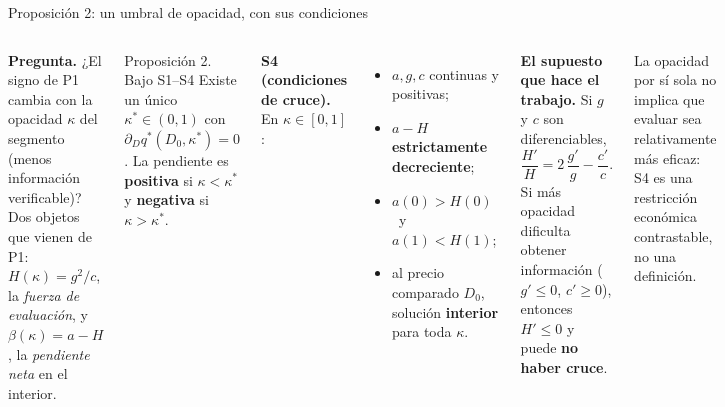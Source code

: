 \documentclass[aspectratio=169,10pt,t]{beamer}
\newcommand{\qs}{q^{*}}
\begin{document}
\begin{frame}{Proposición 2: un umbral de opacidad, con sus condiciones}
\vspace{1.3mm}
\begin{columns}[T,onlytextwidth]
{\small\textbf{Pregunta.} ¿El signo de P1 cambia con la opacidad $\kappa$ del
segmento (menos información verificable)? Dos objetos que vienen de P1:
$H(\kappa)=g^{2}/c$, la \emph{fuerza de evaluación}, y $\beta(\kappa)=a-H$, la
\emph{pendiente neta} en el interior.\par}
\vspace{.3mm}
\begin{propbox}{Proposición 2. Bajo S1--S4}
Existe un único $\kappa^{*}\in(0,1)$ con $\partial_{D}\qs(D_{0},\kappa^{*})=0$.
La pendiente es \textbf{positiva} si $\kappa<\kappa^{*}$ y \textbf{negativa} si
$\kappa>\kappa^{*}$.
\end{propbox}
\vspace{.5mm}
\textbf{S4 (condiciones de cruce).} En $\kappa\in[0,1]$:
\begin{itemize}\setlength{\itemsep}{.6mm}
\item $a,g,c$ continuas y positivas;
\item $a-H$ \textbf{estrictamente decreciente};
\item $a(0)>H(0)$ \ y \ $a(1)<H(1)$;
\item al precio comparado $D_{0}$, solución \textbf{interior} para toda $\kappa$.
\end{itemize}
\begin{keybox}\small
\textbf{El supuesto que hace el trabajo.} Si $g$ y $c$ son diferenciables,
\[
\frac{H'}{H}=2\,\frac{g'}{g}-\frac{c'}{c}.
\]
Si más opacidad dificulta obtener información ($g'\le 0$, $c'\ge 0$), entonces
$H'\le 0$ y puede \textbf{no haber cruce}.
\end{keybox}
\begin{plainbox}\footnotesize
La opacidad por sí sola no implica que evaluar sea relativamente más eficaz: S4 es
una restricción económica contrastable, no una definición.
\end{plainbox}
\end{columns}
\end{frame}
\end{document}
